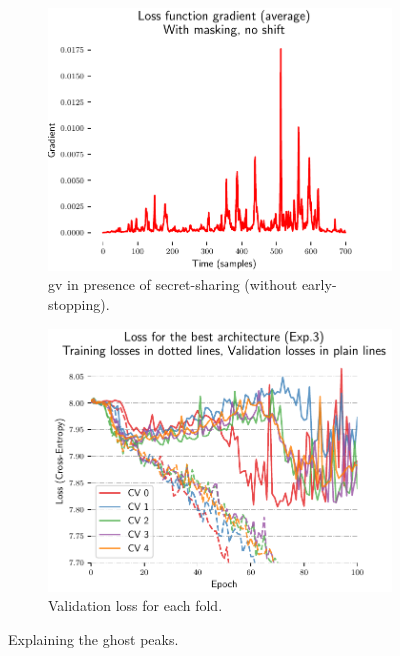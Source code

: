 \begin{figure}
    \centering
    \begin{subfigure}[]{0.49 \textwidth}
        \includegraphics[width=\textwidth]{figures/ASCAD_700/with_mask_no_desynchro/VBP_Node_6191_without_early_stopping_review}
        \caption{\gls{gv} in presence of secret-sharing (without early-stopping).}
        \label{fig:overfitting_peaks}
    \end{subfigure}
    \begin{subfigure}[]{0.49 \textwidth}
        \includegraphics[width=\textwidth]{figures/ASCAD_700/with_mask_no_desynchro/Xent_Node_6191_review}
        \caption{Validation loss for each fold.}
        \label{fig:overfitting_loss}
    \end{subfigure}
	\caption{Explaining the ghost peaks.}
	\label{fig:overfitting}
\end{figure}

